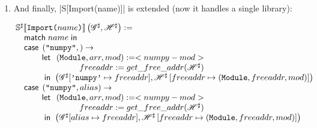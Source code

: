 \begin{enumerate}

\item
  And finally, \pycode|S[Import(name)]| is extended (now it handles
  a single library):

\[\arraycolsep=1.4pt
  \begin{array}[t]{l}
    \Ctx{S^\sharp}{\SLit{Import}{name}}\left(\Glo^\sharp, \Hea^\sharp\right) := \\
    \quad \matchm{name} \\
    \quad \casem{\left(\texttt{"numpy"},\right)} \to \\
    \quad\qquad\begin{array}[t]{rl}
            \letm&
              \begin{array}[t]{rl}
                 (\texttt{Module}, arr, mod) := <numpy-mod> \\
                 freeaddr := get\_free\_addr(\Hea^\sharp) \\
              \end{array} \\
             \inm& \left( \Glo^\sharp[\texttt{'numpy'} \mapsto freeaddr],
                      \Hea^\sharp\left[freeaddr \mapsto (\texttt{Module}, freeaddr, mod)\right]
                   \right) \\
    \end{array} \\
    \quad \casem{\left(\texttt{"numpy"}, alias\right)} \to \\
    \quad\qquad\begin{array}[t]{rl}
            \letm&
              \begin{array}[t]{rl}
                 (\texttt{Module}, arr, mod) := <numpy-mod> \\
                 freeaddr := get\_free\_addr(\Hea^\sharp) \\
              \end{array} \\
             \inm& \left( \Glo^\sharp[alias \mapsto freeaddr],
                      \Hea^\sharp\left[freeaddr \mapsto (\texttt{Module}, freeaddr, mod)\right]
                   \right) \\
    \end{array} \\
  \end{array}\]


\end{enumerate}
